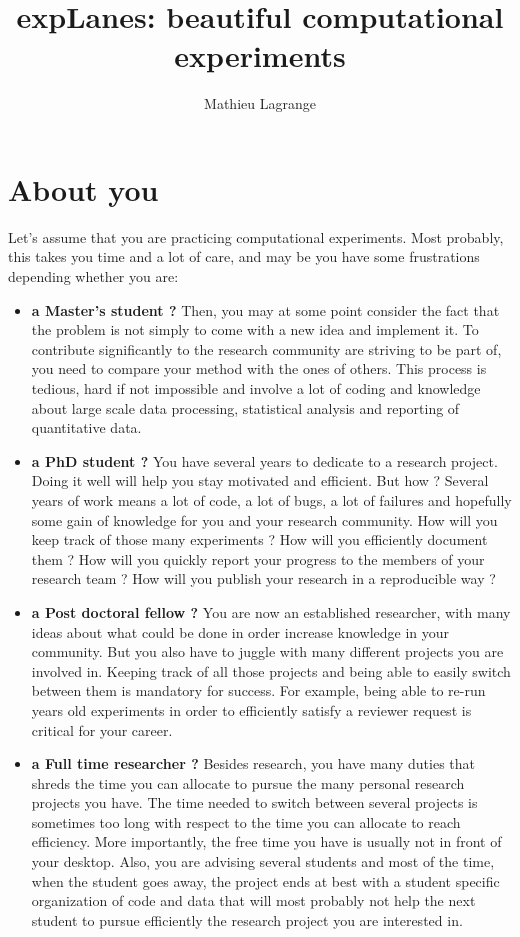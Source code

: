 \documentclass[a4paper,fleqn]{tufte-handout}
\title{ expLanes: beautiful computational experiments }
\author{ Mathieu Lagrange }
\begin{document}
 
  
\maketitle 

\section{About you}

Let's assume that you are practicing computational experiments. Most probably, this takes you time and a lot of care, and may be you have some frustrations depending whether you are:
\begin{itemize}
\item  \textbf{a Master's student ?} Then, you may at some point consider the fact that the problem is not simply to come with a new idea and implement it. To contribute significantly to the research community are striving to be part of, you need to compare your method with the ones of others. This process is tedious, hard if not impossible and involve a lot of coding and knowledge about large scale data processing, statistical analysis and reporting of quantitative data.

\item \textbf{a PhD student ?} You have several years to dedicate to a research project. Doing it well will help you stay motivated and efficient. But how ? Several years of work means a lot of code, a lot of bugs, a lot of failures and hopefully some gain of knowledge for you and your research community. How will you keep track of those many experiments ? How will you efficiently document them ?  How will you quickly report your progress to the members of your research team ? How will you publish your research in a reproducible way ?

\item \textbf{a Post doctoral fellow ?} You are now an established researcher, with many ideas about what could be done in order increase knowledge in your community. But you also have to juggle with many different projects you are involved in. Keeping track of all those projects and being able to easily switch between them is mandatory for success. For example, being able to re-run years old experiments in order to efficiently satisfy a reviewer request is critical for your career.

\item \textbf{a Full time researcher ?} Besides research, you have many duties that shreds the time you can allocate to pursue the many personal research projects you have. The time needed to switch between several projects is sometimes too long with respect to the time you can allocate to reach efficiency. More importantly, the free time you have is usually not in front of your desktop. Also, you are advising several students and most of the time, when the student goes away, the project ends at best with a student specific organization of code and data that will most probably not help the next student to pursue efficiently the research project you are interested in.

\end{itemize}
\end{document}

